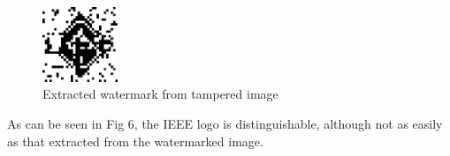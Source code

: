 \documentclass[conference]{IEEEtran}
\begin{document}
\begin{figure}[h]
    \centering
    \includegraphics[width=0.2\textwidth, angle=0]{images/output_watermark_extracted_fromTampered.png}
    \caption{Extracted watermark from tampered image}
    \label{fig6}
\end{figure}

As can be seen in Fig 6, the IEEE logo is distinguishable, although not as easily as that extracted from the watermarked image.







\cite{CHANG20051577}
\cite{hinno2021simple}
\end{document}

